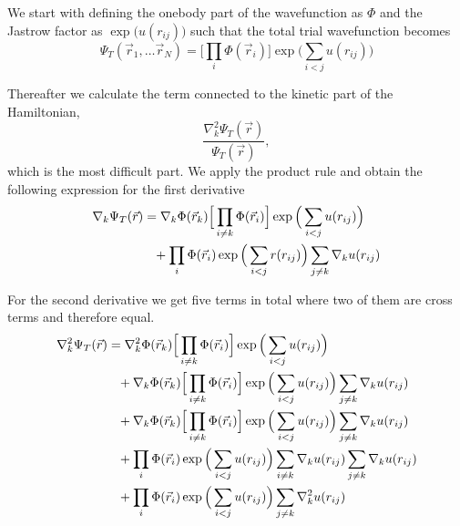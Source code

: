 \documentclass[norsk,a4paper,12pt]{article}
\begin{document}
We start with defining the onebody part of the wavefunction as $\Phi$ and the Jastrow factor as $\exp\big(u(r_{ij})\big)$ such that the total trial wavefunction becomes
\begin{equation}
\Psi_T(\vec{r}_1,\hdots\vec{r}_N)=\Big[\prod_i\Phi(\vec{r}_i)\Big]\exp\Big(\sum_{i<j}u(r_{ij})\Big)
\end{equation}

Thereafter we calculate the term connected to the kinetic part of the Hamiltonian,
\begin{equation}
\frac{\nabla_k^2\Psi_T(\vec{r})}{\Psi_T(\vec{r})},
\label{eq:ham_kin}
\end{equation}
which is the most difficult part. We apply the product rule and obtain the following expression for the first derivative
\begin{align}
\nabla_k\Psi_T(\vec{r})&=\nabla_k\Phi(\vec{r}_k)\Big[\prod_{i\neq k}\Phi(\vec{r}_i)\Big]\exp\Big(\sum_{i<j}u(r_{ij})\Big)\notag\\
&\phantom{=}+\prod_i\Phi(\vec{r}_i)\exp\Big(\sum_{i<j}r(r_{ij})\Big)
\sum_{j\neq k}\nabla_k u(r_{ij})
\end{align}

For the second derivative we get five terms in total where two of them are cross terms and therefore equal. 
\begin{align}
\nabla_k^2\Psi_T(\vec{r})&=\nabla_k^2\Phi(\vec{r}_k)\Big[\prod_{i \neq k}\Phi(\vec{r}_i)\Big]\exp\Big(\sum_{i<j}u(r_{ij})\Big)\notag\\
&\phantom{=}+\nabla_k\Phi(\vec{r}_k)\Big[\prod_{i \neq k}\Phi(\vec{r}_i)\Big]\exp\Big(\sum_{i<j}u(r_{ij})\Big)\sum_{j\neq k}\nabla_ku(r_{ij})\notag\\
&\phantom{=}+\nabla_k\Phi(\vec{r}_k)\Big[\prod_{i \neq k}\Phi(\vec{r}_i)\Big]\exp\Big(\sum_{i<j}u(r_{ij})\Big)\sum_{j\neq k}\nabla_ku(r_{ij})\\
&\phantom{=}+\prod_i\Phi(\vec{r}_i)\exp\Big(\sum_{i<j}u(r_{ij})\Big)\sum_{i\neq k}\nabla_ku(r_{ij})\sum_{j\neq k}\nabla_ku(r_{ij})\notag\\
&\phantom{=}+\prod_i\Phi(\vec{r}_i)\exp\Big(\sum_{i<j}u(r_{ij})\Big)\sum_{j\neq k}\nabla_k^2u(r_{ij})\notag
\end{align}
\end{document}

